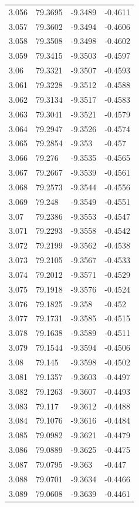 \begin{tabular}{llll}
3.056 & 79.3695 & -9.3489 & -0.4611 \\
3.057 & 79.3602 & -9.3494 & -0.4606 \\
3.058 & 79.3508 & -9.3498 & -0.4602 \\
3.059 & 79.3415 & -9.3503 & -0.4597 \\
3.06 & 79.3321 & -9.3507 & -0.4593 \\
3.061 & 79.3228 & -9.3512 & -0.4588 \\
3.062 & 79.3134 & -9.3517 & -0.4583 \\
3.063 & 79.3041 & -9.3521 & -0.4579 \\
3.064 & 79.2947 & -9.3526 & -0.4574 \\
3.065 & 79.2854 & -9.353 & -0.457 \\
3.066 & 79.276 & -9.3535 & -0.4565 \\
3.067 & 79.2667 & -9.3539 & -0.4561 \\
3.068 & 79.2573 & -9.3544 & -0.4556 \\
3.069 & 79.248 & -9.3549 & -0.4551 \\
3.07 & 79.2386 & -9.3553 & -0.4547 \\
3.071 & 79.2293 & -9.3558 & -0.4542 \\
3.072 & 79.2199 & -9.3562 & -0.4538 \\
3.073 & 79.2105 & -9.3567 & -0.4533 \\
3.074 & 79.2012 & -9.3571 & -0.4529 \\
3.075 & 79.1918 & -9.3576 & -0.4524 \\
3.076 & 79.1825 & -9.358 & -0.452 \\
3.077 & 79.1731 & -9.3585 & -0.4515 \\
3.078 & 79.1638 & -9.3589 & -0.4511 \\
3.079 & 79.1544 & -9.3594 & -0.4506 \\
3.08 & 79.145 & -9.3598 & -0.4502 \\
3.081 & 79.1357 & -9.3603 & -0.4497 \\
3.082 & 79.1263 & -9.3607 & -0.4493 \\
3.083 & 79.117 & -9.3612 & -0.4488 \\
3.084 & 79.1076 & -9.3616 & -0.4484 \\
3.085 & 79.0982 & -9.3621 & -0.4479 \\
3.086 & 79.0889 & -9.3625 & -0.4475 \\
3.087 & 79.0795 & -9.363 & -0.447 \\
3.088 & 79.0701 & -9.3634 & -0.4466 \\
3.089 & 79.0608 & -9.3639 & -0.4461 \\

\end{tabular}
